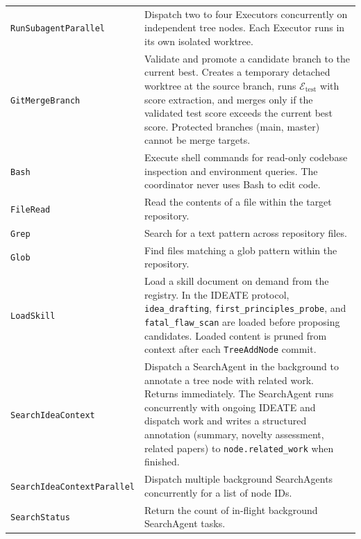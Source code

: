 \documentclass{llmxive}
\providecommand{\Eval}{\mathcal{E}}
\providecommand{\test}{\mathrm{test}}
\begin{document}
\begin{xltabular}{\linewidth}{>{\arraybackslash}p{3.8cm}>{\arraybackslash}X}
\texttt{RunSubagentParallel} & Dispatch two to four Executors concurrently on independent tree nodes. Each Executor runs in its own isolated worktree. \\
\texttt{GitMergeBranch} & Validate and promote a candidate branch to the current best. Creates a temporary detached worktree at the source branch, runs $\Eval_\test$ with score extraction, and merges only if the validated test score exceeds the current best score. Protected branches (main, master) cannot be merge targets. \\
\texttt{Bash} & Execute shell commands for read-only codebase inspection and environment queries. The coordinator never uses Bash to edit code. \\
\texttt{FileRead} & Read the contents of a file within the target repository. \\
\texttt{Grep} & Search for a text pattern across repository files. \\
\texttt{Glob} & Find files matching a glob pattern within the repository. \\
\texttt{LoadSkill} & Load a skill document on demand from the registry. In the IDEATE protocol, \texttt{idea\_drafting}, \texttt{first\_principles\_probe}, and \texttt{fatal\_flaw\_scan} are loaded before proposing candidates. Loaded content is pruned from context after each \texttt{TreeAddNode} commit. \\
\texttt{SearchIdeaContext} & Dispatch a SearchAgent in the background to annotate a tree node with related work. Returns immediately. The SearchAgent runs concurrently with ongoing IDEATE and dispatch work and writes a structured annotation (summary, novelty assessment, related papers) to \texttt{node.related\_work} when finished. \\
\texttt{SearchIdeaContextParallel} & Dispatch multiple background SearchAgents concurrently for a list of node IDs. \\
\texttt{SearchStatus} & Return the count of in-flight background SearchAgent tasks. \\
\end{xltabular}
\endgroup
\end{document}
